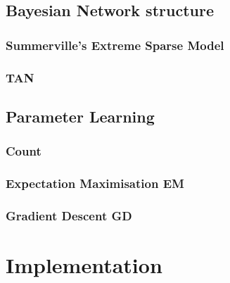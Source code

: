 \documentclass{UoYCSproject}
\begin{document}
\subsection{Bayesian Network structure}
\subsubsection{Summerville's Extreme Sparse Model}

\subsubsection{TAN}


\subsection{Parameter Learning}
\subsubsection{Count}
\subsubsection{Expectation Maximisation EM} %
\subsubsection{Gradient Descent GD}

\section{Implementation} %
\end{document}

